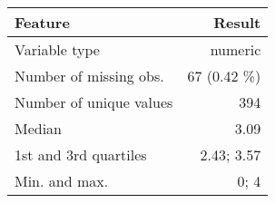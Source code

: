 \documentclass[]{article}
\begin{document}
\begin{longtable}[]{@{}lr@{}}
\toprule
\begin{minipage}[b]{0.34\columnwidth}\raggedright\strut
Feature\strut
\end{minipage} & \begin{minipage}[b]{0.17\columnwidth}\raggedleft\strut
Result\strut
\end{minipage}\tabularnewline
\midrule
\endhead
\begin{minipage}[t]{0.34\columnwidth}\raggedright\strut
Variable type\strut
\end{minipage} & \begin{minipage}[t]{0.17\columnwidth}\raggedleft\strut
numeric\strut
\end{minipage}\tabularnewline
\begin{minipage}[t]{0.34\columnwidth}\raggedright\strut
Number of missing obs.\strut
\end{minipage} & \begin{minipage}[t]{0.17\columnwidth}\raggedleft\strut
67 (0.42 \%)\strut
\end{minipage}\tabularnewline
\begin{minipage}[t]{0.34\columnwidth}\raggedright\strut
Number of unique values\strut
\end{minipage} & \begin{minipage}[t]{0.17\columnwidth}\raggedleft\strut
394\strut
\end{minipage}\tabularnewline
\begin{minipage}[t]{0.34\columnwidth}\raggedright\strut
Median\strut
\end{minipage} & \begin{minipage}[t]{0.17\columnwidth}\raggedleft\strut
3.09\strut
\end{minipage}\tabularnewline
\begin{minipage}[t]{0.34\columnwidth}\raggedright\strut
1st and 3rd quartiles\strut
\end{minipage} & \begin{minipage}[t]{0.17\columnwidth}\raggedleft\strut
2.43; 3.57\strut
\end{minipage}\tabularnewline
\begin{minipage}[t]{0.34\columnwidth}\raggedright\strut
Min. and max.\strut
\end{minipage} & \begin{minipage}[t]{0.17\columnwidth}\raggedleft\strut
0; 4\strut
\end{minipage}\tabularnewline
\bottomrule
\end{longtable}
\end{document}
